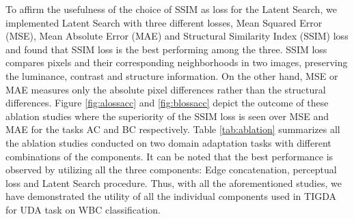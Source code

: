 \documentclass[journal,twoside,web]{IEEEtran}
\renewcommand{\textrightarrow}{}
\begin{document}
To affirm the usefulness of the choice of SSIM as loss for the Latent Search, we implemented Latent Search with three different losses, Mean Squared Error (MSE), Mean Absolute Error (MAE) and Structural Similarity Index (SSIM) loss and found that SSIM loss is the best performing among the three. SSIM loss compares pixels and their corresponding neighborhoods in two images, preserving the luminance, contrast and structure information. On the other hand, MSE or MAE measures only the absolute pixel differences rather than the structural differences. Figure \ref{fig:alossacc} and \ref{fig:blossacc} depict the outcome of these ablation studies where the superiority of the SSIM loss  is seen over MSE and MAE for the tasks A\textrightarrow C and B\textrightarrow C respectively. Table \ref{tab:ablation} summarizes all the ablation studies conducted  on two domain adaptation tasks with different combinations of the components. It can be noted that the best performance is observed by utilizing all the three components: Edge concatenation, perceptual loss and Latent Search procedure. Thus, with all the aforementioned studies, we have demonstrated the utility of all the individual components used in TIGDA for UDA task on WBC classification.  
\end{document}
